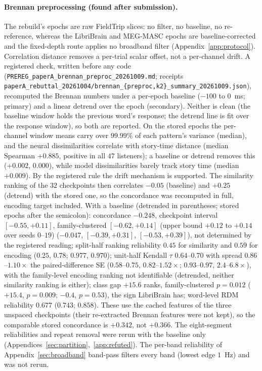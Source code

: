 \documentclass{article}
\begin{document}
\paragraph{Brennan preprocessing (found after submission).}\label{app:brennan-preproc} The rebuild's
epochs are raw FieldTrip slices: no filter, no baseline, no re-reference, whereas the LibriBrain and
MEG-MASC epochs are baseline-corrected and the fixed-depth route applies no broadband filter
(Appendix~\ref{app:protocol}). Correlation distance removes a per-trial scalar offset, not a
per-channel drift. A registered check, written before any code
(\texttt{PREREG\_paperA\_brennan\_preproc\_20261009.md}; receipts
\texttt{paperA\_rebuttal\_20261004/\allowbreak brennan\_\{preproc,k2\}\_summary\_20261009.json}),
recomputed the Brennan numbers under a per-epoch baseline ($-100$ to $0$~ms; primary) and a linear
detrend over the epoch (secondary). Neither is clean (the baseline window holds the previous word's
response; the detrend line is fit over the response window), so both are reported. On the stored
epochs the per-channel window means carry over $99.99\%$ of each pattern's variance (median), and the
neural dissimilarities correlate with story-time distance (median Spearman $+0.885$, positive in all
$47$ listeners); a baseline or detrend removes this ($+0.002$, $0.000$), while model dissimilarities
barely track story time (median $+0.009$). By the registered rule the drift mechanism is supported. The
similarity ranking of the $32$ checkpoints then correlates $-0.05$ (baseline) and $+0.25$ (detrend)
with the stored one, so the concordance was recomputed in full, encoding target included. With a
baseline (detrended in parentheses; stored epochs after the semicolon): concordance $-0.248$,
checkpoint interval $[-0.55, +0.11]$, family-clustered $[-0.62, +0.14]$ (upper bound $+0.12$ to
$+0.14$ over seeds $0$--$19$) ($-0.047$, $[-0.39, +0.31]$, $[-0.53, +0.39]$), not determined by the
registered reading; split-half ranking reliability $0.45$ for similarity and $0.59$ for encoding
($0.25$, $0.78$; $0.977$, $0.970$); unit-half Kendall $\tau$ $0.64$--$0.70$ with spread
$0.86$--$1.10\times$ the paired-difference SE ($0.58$--$0.75$, $0.82$--$1.52\times$; $0.93$--$0.97$,
$2.4$--$6.8\times$), with the family-level encoding ranking not identifiable (detrended, neither
similarity ranking is either); class gap $+15.6$ ranks, family-clustered $p=0.012$ ($+15.4$,
$p=0.009$; $-0.4$, $p=0.53$), the sign LibriBrain has; word-level RDM reliability $0.677$ ($0.743$;
$0.858$). These use the cached features of the three unspaced checkpoints (their re-extracted
Brennan features were not kept), so the comparable stored concordance is $+0.342$, not $+0.366$. The
eight-segment reliabilities and repeat removal were rerun with the baseline only
(Appendices~\ref{sec:partition},~\ref{app:refuted}). The per-band reliability of
Appendix~\ref{sec:broadband} band-pass filters every band (lowest edge $1$~Hz) and was not rerun.
\end{document}
